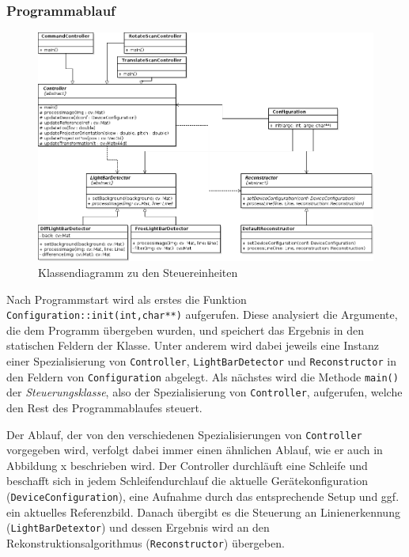 \documentclass[ngerman,a4paper,parskip=half]{scrartcl}
\begin{document}
\subsubsection{Programmablauf}

\begin{figure}
	\centering
	\includegraphics[width=\linewidth]{includes/classdiagram_control.png}
	\caption{Klassendiagramm zu den Steuereinheiten}
	\label{fig:classes_control}
\end{figure}

Nach Programmstart wird als erstes die Funktion \texttt{Configuration::init(int,char**)} aufgerufen. Diese analysiert die Argumente, die dem Programm übergeben wurden, und speichert das Ergebnis in den statischen Feldern der Klasse. Unter anderem wird dabei jeweils eine Instanz einer Spezialisierung von \texttt{Controller}, \texttt{LightBarDetector} und \texttt{Reconstructor} in den Feldern von \texttt{Configuration} abgelegt. Als nächstes wird die Methode \texttt{main()} der \emph{Steuerungsklasse}, also der Spezialisierung von \texttt{Controller}, aufgerufen, welche den Rest des Programmablaufes steuert.

Der Ablauf, der von den verschiedenen Spezialisierungen von \texttt{Controller} vorgegeben wird, verfolgt dabei immer einen ähnlichen Ablauf, wie er auch in {\color{red} Abbildung x} beschrieben wird. Der Controller durchläuft eine Schleife und beschafft sich in jedem Schleifendurchlauf die aktuelle Gerätekonfiguration (\texttt{DeviceConfiguration}), eine Aufnahme durch das entsprechende Setup und ggf. ein aktuelles Referenzbild. Danach übergibt es die Steuerung an Linienerkennung (\texttt{LightBarDetextor}) und dessen Ergebnis wird an den Rekonstruktionsalgorithmus (\texttt{Reconstructor}) übergeben.
\end{document}

